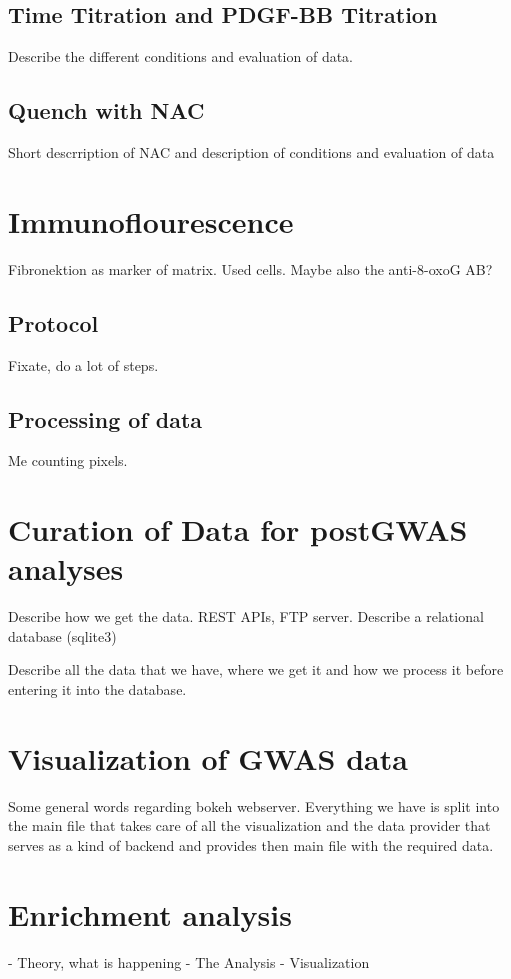     \subsection{Time Titration and PDGF-BB Titration}
    Describe the different conditions and evaluation of data.

    \subsection{Quench with NAC}
    Short descrription of NAC and description of conditions and evaluation of data

\section{Immunoflourescence}
\label{sec:if}
Fibronektion as marker of matrix. Used cells.
Maybe also the anti-8-oxoG AB?

    \subsection{Protocol}
    Fixate, do a lot of steps.

    \subsection{Processing of data}
    Me counting pixels.

\section{Curation of Data for postGWAS analyses}
\label{sec:database}
Describe how we get the data. REST APIs, FTP server.
Describe a relational database (sqlite3)

Describe all the data that we have, where we get it and how we process it before entering it into the database.

\section{Visualization of GWAS data}
\label{sec:gwas_vis}
Some general words regarding bokeh webserver.
Everything we have is split into the main file that takes care of all the visualization and the data provider that serves as a kind of backend and provides then main file with the required data.

\section{Enrichment analysis}
\label{sec:enrichment}
- Theory, what is happening
- The Analysis
- Visualization
